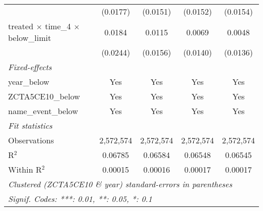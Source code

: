 \begin{tabular}{lcccc}
                                                       & (0.0177)        & (0.0151)        & (0.0152)        & (0.0154)\\   
   treated $\times$ time\_4 $\times$ below\_limit      & 0.0184          & 0.0115          & 0.0069          & 0.0048\\   
                                                       & (0.0244)        & (0.0156)        & (0.0140)        & (0.0136)\\   
   \midrule
   \emph{Fixed-effects}\\
   year\_below                                         & Yes             & Yes             & Yes             & Yes\\  
   ZCTA5CE10\_below                                    & Yes             & Yes             & Yes             & Yes\\  
   name\_event\_below                                  & Yes             & Yes             & Yes             & Yes\\  
   \midrule
   \emph{Fit statistics}\\
   Observations                                        & 2,572,574       & 2,572,574       & 2,572,574       & 2,572,574\\  
   R$^2$                                               & 0.06785         & 0.06584         & 0.06548         & 0.06545\\  
   Within R$^2$                                        & 0.00015         & 0.00016         & 0.00017         & 0.00017\\  
   \midrule \midrule
   \multicolumn{5}{l}{\emph{Clustered (ZCTA5CE10 \& year) standard-errors in parentheses}}\\
   \multicolumn{5}{l}{\emph{Signif. Codes: ***: 0.01, **: 0.05, *: 0.1}}\\
\end{tabular}
\par\endgroup
